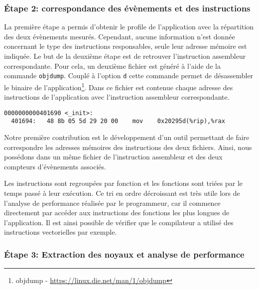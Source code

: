   
        
    \subsubsection{Étape 2: correspondance des évènements et des instructions}

    La première étape a permis d'obtenir le profile de l'application avec la répartition des deux évènements mesurés. Cependant, aucune information n'est donnée concernant le type des instructions responsables, seule leur adresse mémoire est indiquée. Le but de la deuxième étape est de retrouver l'instruction assembleur correspondante. Pour cela, un deuxième fichier est généré à l'aide de la commande \verb=objdump=. Couplé à l'option \verb=d= cette commande permet de désassembler le binaire de l'application\footnote{objdump - \url{https://linux.die.net/man/1/objdump}}. Dans ce fichier est contenue chaque adresse des instructions de l'application avec l'instruction assembleur correspondante.

\begin{lstlisting}[label=lst:dev_op_obj_out, caption=La commande objdump permet de désassembler le fichier binaire de l'application.]
0000000000401690 <_init>:
  401694:	48 8b 05 5d 29 20 00 	mov    0x20295d(%rip),%rax
\end{lstlisting}  

        Notre première contribution est le développement d'un outil permettant de faire correspondre les adresses mémoires des instructions des deux fichiers. Ainsi, nous possédons dans un même fichier de l'instruction assembleur et des deux compteurs d'évènements associés. 
        

        Les instructions sont regroupées par fonction et les fonctions sont triées par le temps passé à leur exécution. Ce tri en ordre décroissant est très utile lors de l'analyse de performance réalisée par le programmeur, car il commence directement par accéder aux instructions des fonctions les plus longues de l'application. Il est ainsi possible de vérifier que le compilateur a utilisé des instructions vectorielles par exemple. 


    \subsubsection{Étape 3: Extraction des noyaux et analyse de performance}
    
